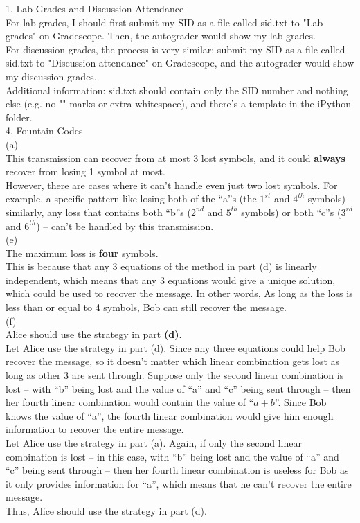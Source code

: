 \documentclass{article}
\begin{document}
{\Large 1. Lab Grades and Discussion Attendance}\\[.3cm]
\indent For lab grades, I should first submit my SID as a file called sid.txt to "Lab grades" on Gradescope. Then, the autograder would show my lab grades.\\
\indent For discussion grades, the process is very similar: submit my SID as a file called sid.txt to "Discussion attendance" on Gradescope, and the autograder would show my discussion grades.\\[.2cm]
\indent Additional information: sid.txt should contain only the SID number and nothing else (e.g. no "" marks or extra whitespace), and there's a template in the iPython folder.\pagebreak\\

{\Large 4. Fountain Codes}\\[.3cm]
(a)\\
\indent This transmission can recover from at most 3 lost symbols, and it could \textbf{always} recover from losing 1 symbol at most.\\[.1cm]
\indent However, there are cases where it can’t handle even just two lost symbols. For example, a specific pattern like losing both of the “a”s (the $1^{st}$ and $4^{th}$ symbols) – similarly, any loss that contains both “b”s ($2^{nd}$ and $5^{th}$ symbols) or both “c”s ($3^{rd}$ and $6^{th}$) – can’t be handled by this transmission.\pagebreak\\
(e)\\
\indent The maximum loss is \textbf{four} symbols.\\[.1cm]
\indent This is because that any 3 equations of the method in part (d) is linearly independent, which means that any 3 equations would give a unique solution, which could be used to recover the message. In other words, As long as the loss is less than or equal to 4 symbols, Bob can still recover the message. \\[.3cm]
(f)\\
\indent Alice should use the strategy in part \textbf{(d)}.\\[.1cm]
\indent Let Alice use the strategy in part (d). Since any three equations could help Bob recover the message, so it doesn't matter which linear combination gets lost as long as other 3 are sent through. Suppose only the second linear combination is lost – with “b” being lost and the value of “a” and “c” being sent through – then her fourth linear combination would contain the value of ``$a + b$''. Since Bob knows the value of “a”, the fourth linear combination would give him enough information to recover the entire message.\\
\indent Let Alice use the strategy in part (a). Again, if only the second linear combination is lost – in this case, with “b” being lost and the value of “a” and “c” being sent through – then her fourth linear combination is useless for Bob as it only provides information for “a”, which means that he can’t recover the entire message.\\
\indent Thus, Alice should use the strategy in part (d).
\end{document}
